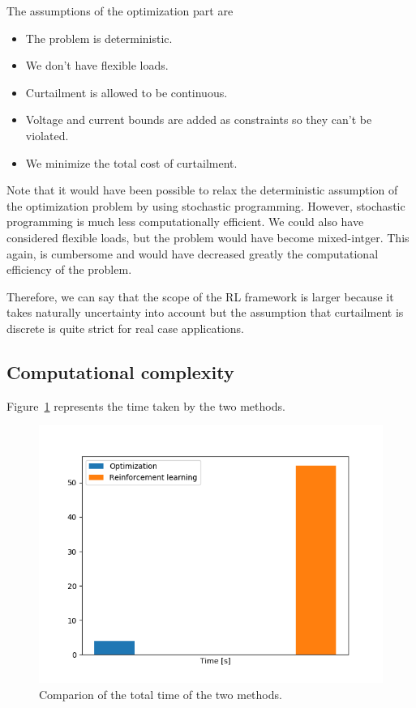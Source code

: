 The assumptions of the optimization part are
\begin{itemize}
\item The problem is deterministic.
\item We don't have flexible loads.
\item Curtailment is allowed to be continuous.
\item Voltage and current bounds are added as constraints so they can't be violated.
\item We minimize the total cost of curtailment.
\end{itemize}

Note that it would have been possible to relax the deterministic assumption of the optimization problem by using stochastic programming.
However, stochastic programming is much less computationally efficient.
We could also have considered flexible loads, but the problem would have become mixed-intger.
This again, is cumbersome and would have decreased greatly the computational efficiency of the problem.

Therefore, we can say that the scope of the RL framework is larger because it takes naturally uncertainty into account but the assumption that curtailment is discrete is quite strict for real case applications.

\subsection{Computational complexity}
Figure~\ref{fig:time} represents the time taken by the two methods.

\begin{figure}
\centering
\includegraphics[scale=0.5]{img/time}
\caption{Comparion of the total time of the two methods.}
\label{fig:time}
\end{figure}

